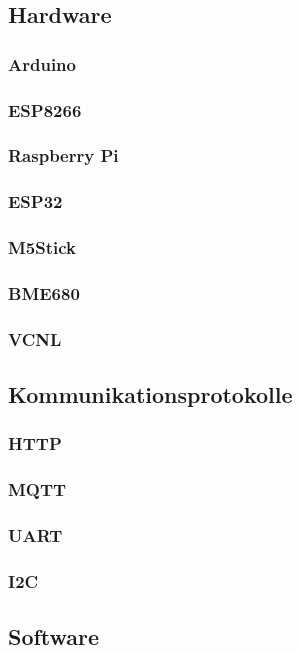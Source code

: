 \documentclass[12pt, letterpaper]{article}
\begin{document}
  \subsection{Hardware}
    \subsubsection{Arduino}
    \subsubsection{ESP8266}
    \subsubsection{Raspberry Pi}
    \subsubsection{ESP32}
    \subsubsection{M5Stick}
    \subsubsection{BME680}
    \subsubsection{VCNL}
    

  \subsection{Kommunikationsprotokolle}
  \subsubsection{HTTP}
  \subsubsection{MQTT}
  \subsubsection{UART}
  \subsubsection{I2C}
    
  \subsection{Software}
\end{document}

